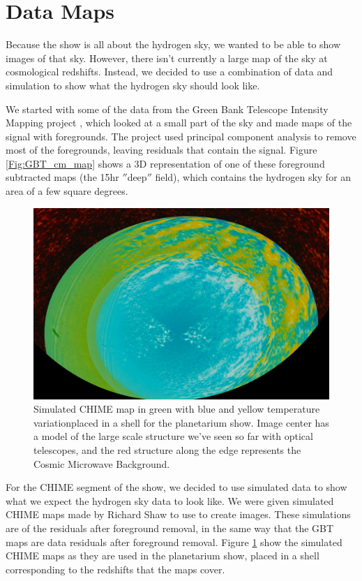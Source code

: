 \section{\cm Data Maps}

Because the show is all about the hydrogen sky, we wanted to be able to show images of that sky. However, there isn't currently a large map of the \cm sky at cosmological redshifts. Instead, we decided to use a combination of data and simulation to show what the hydrogen sky should look like.

We started with some of the data from the Green Bank Telescope Intensity Mapping project \cite{masui_2012}\cite{switzer_2013}, which looked at a small part of the sky and made maps of the \cm signal with foregrounds. The project used principal component analysis to remove most of the foregrounds, leaving residuals that contain the \cm signal. Figure \ref{Fig:GBT_cm_map} shows a 3D representation of one of these foreground subtracted maps (the 15hr $''$deep$''$ field), which contains the hydrogen sky for an area of a few square degrees. 

\begin{figure}[htb]
\begin{center}
\includegraphics[width=0.95\linewidth]{Planetarium/figures/CHIME_cm_map.jpg}
\caption{Simulated CHIME map in green with blue and yellow temperature variationplaced in a shell for the planetarium show. Image center has a model of the large scale structure we've seen so far with optical telescopes, and the red structure along the edge represents the Cosmic Microwave Background.  }
\label{Fig:CHIME_cm_map}
\end{center}
\end{figure}

For the CHIME segment of the show, we decided to use simulated data to show what we expect the hydrogen sky data to look like. We were given simulated CHIME \cm maps made by Richard Shaw \cite{shaw_2014} to use to create images. These simulations are of the \cm residuals after foreground removal, in the same way that the GBT maps are data residuals after foreground removal. Figure \ref{Fig:CHIME_cm_map} show the simulated CHIME maps as they are used in the planetarium show, placed in a shell corresponding to the redshifts that the maps cover. 



